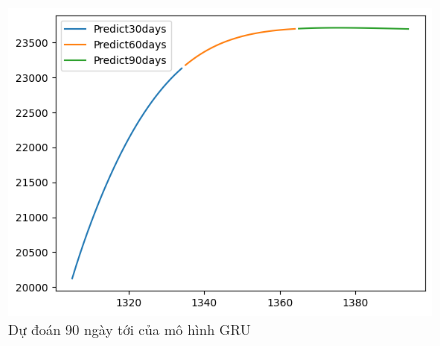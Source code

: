 \begin{figure}[H]
\begin{minipage}{0.15\textwidth}
    \includegraphics[width=1\textwidth]{resources/chapter-5/newdata1/predicted/EXIM_GRU_9_1_30days.png}
    \end{minipage}
    \hfill
    
    \caption{Dự đoán 90 ngày tới của mô hình GRU}
    \label{fig:GRU_30days}
\end{figure}





